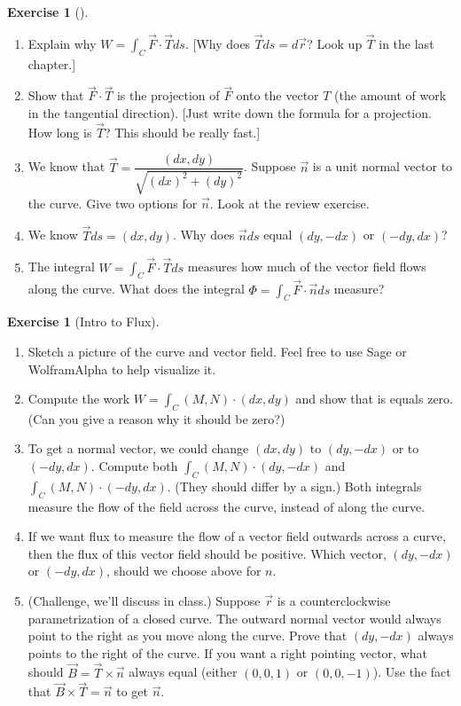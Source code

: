 \documentclass[10pt,]{book}
\theoremstyle{plain}
\theoremstyle{definition}
\theoremstyle{definition}
\theoremstyle{definition}
\theoremstyle{definition}
\newtheorem{exploration}[project]{Exercise}
\theoremstyle{definition}
\numberwithin{equation}{section}
\newcommand{\ds}{\displaystyle}
\begin{document}
\begin{exploration}[]\label{exploration-194}
\leavevmode%
\begin{enumerate}[font=\bfseries,label=(\alph*),ref=\alph*]
\item\label{task-484} Explain why \(W = \int_C \vec F\cdot \vec T ds\). [Why does \(\vec T ds = d\vec r\)?  Look up \(\vec T\) in the last chapter.] %
\item\label{task-485} Show that \(\vec F\cdot \vec T\) is the projection of \(\vec F\) onto the vector \(T\) (the amount of work in the tangential direction). [Just write down the formula for a projection.  How long is \(\vec T\)?  This should be really fast.]%
\item\label{task-486} We know that \(\vec T = \dfrac{(dx, dy)}{\sqrt{(dx)^2+(dy)^2}}\).  Suppose \(\vec n\) is a unit normal vector to the curve. Give two options for \(\vec n\). Look at the review exercise.%
%
\item\label{task-487} We know  \(\vec T ds = (dx,dy)\). Why does \(\vec n ds\) equal \((dy,-dx)\) or \((-dy,dx)\)?%
\item\label{task-488} The integral \(W = \int_C \vec F\cdot \vec T ds\) measures how much of the vector field flows along the curve.  What does the integral \(\Phi = \int_C \vec F\cdot \vec n ds\) measure?%
\end{enumerate}
\end{exploration}
\begin{exploration}[Intro to Flux]\label{exploration-195}
\leavevmode%
\begin{enumerate}[font=\bfseries,label=(\alph*),ref=\alph*]
\item\label{task-489} Sketch a picture of the curve and vector field. Feel free to use Sage or WolframAlpha to help visualize it.%
\item\label{task-490} Compute the work \(\ds W= \int_C (M,N)\cdot (dx,dy)\) and show that is equals zero. (Can you give a reason why it should be zero?)  %
\item\label{task-491} To get a normal vector, we could change \((dx,dy)\) to \((dy,-dx)\) or to \((-dy,dx)\). Compute both \(\ds \int_C (M,N)\cdot (dy,-dx)\) and \(\ds \int_C (M,N)\cdot (-dy,dx)\). (They should differ by a sign.) Both integrals measure the flow of the field across the curve, instead of along the curve.%
\item\label{task-492} If we want flux to measure the flow of a vector field outwards across a curve, then the flux of this vector field should be positive.  Which vector, \((dy,-dx)\) or \((-dy,dx)\),  should we choose above for \(n\).  %
\item\label{task-493} (Challenge, we'll discuss in class.) Suppose \(\vec r\) is a counterclockwise parametrization of a closed curve.  The outward normal vector would always point to the right as you move along the curve.  Prove that \((dy,-dx)\) always points to the right of the curve. If you want a right pointing vector, what should \(\vec B=\vec T\times \vec n\) always equal (either \((0,0,1)\) or \((0,0,-1)\)). Use the fact that \(\vec B\times \vec T = \vec n\) to get \(\vec n\).%
%
\end{enumerate}
\end{exploration}
\end{document}
